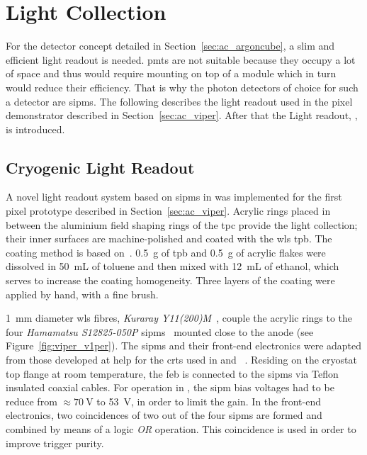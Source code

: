\section{Light Collection}
\label{sec:studies_light-col}

For the \AC{} detector concept detailed in Section~\ref{sec:ac_argoncube}, a slim and efficient light readout is needed.
\glspl{pmt} are not suitable because they occupy a lot of space and thus would require mounting on top of a module which in turn would reduce their efficiency.
That is why the photon detectors of choice for such a detector are \glspl{sipm}.
The following describes the light readout used in the \AC{} pixel demonstrator described in Section~\ref{sec:ac_viper}.
After that the \AC{} Light readout, \AL{}, is introduced.


\subsection{Cryogenic  Light Readout}
\label{sec:studies_light-col_viper}

A novel light readout system based on \glspl{sipm} in \lar{} was implemented for the first pixel prototype described in Section~\ref{sec:ac_viper}.
Acrylic rings placed in between the aluminium field shaping rings of the \gls{tpc} provide the light collection; their inner surfaces are machine-polished and coated with the \gls{wls} \gls{tpb}. 
The coating method is based on~\cite{TPBcoating}.
\SI{0.5}{\gram} of \gls{tpb} and \SI{0.5}{\gram} of acrylic flakes were dissolved in \SI{50}{\milli\liter} of toluene and then mixed with \SI{12}{\milli\liter} of ethanol, which serves to increase the coating homogeneity. 
Three layers of the coating were applied by hand, with a fine brush. 

\SI{1}{\milli\metre} diameter \gls{wls} fibres, \emph{Kuraray Y11(200)M}~\cite{kuraray}, couple the acrylic rings to the four \emph{Hamamatsu S12825-050P} \glspl{sipm}~\cite{crt_sipm} mounted close to the anode (see Figure~\ref{fig:viper_v1per}). 
The \glspl{sipm} and their front-end electronics were adapted from those developed at \gls{help} for the \glspl{crt} used in \uboone{} and \sbnd{}~\cite{crt, crt_feb}.
Residing on the cryostat top flange at room temperature, the \gls{feb} is connected to the \glspl{sipm} via Teflon insulated coaxial cables.
For operation in \lar{}, the \gls{sipm} bias voltages had to be reduce from $\approx \SI{70}{\volt}$ to \SI{53}{\volt}, in order to limit the gain.   
In the front-end electronics, two coincidences of two out of the four \glspl{sipm} are formed and combined by means of a logic \textit{OR} operation. 
This coincidence is used in order to improve trigger purity.


